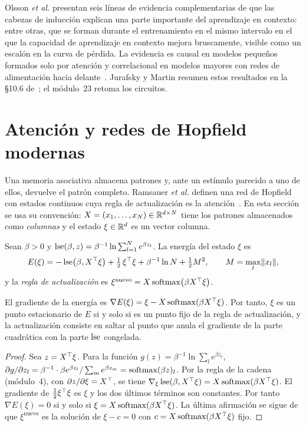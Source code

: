 \begin{observacion}
Olsson \emph{et al.} presentan seis líneas de evidencia complementarias de que las cabezas de inducción explican una parte importante del aprendizaje en contexto: entre otras, que se forman durante el entrenamiento en el mismo intervalo en el que la capacidad de aprendizaje en contexto mejora bruscamente, visible como un escalón en la curva de pérdida. La evidencia es causal en modelos pequeños formados solo por atención y correlacional en modelos mayores con redes de alimentación hacia delante~\cite{olsson}. Jurafsky y Martin resumen estos resultados en la §10.6 de~\cite{jm3}; el módulo~23 retoma los circuitos.
\end{observacion}

\section{Atención y redes de Hopfield modernas}

Una memoria asociativa almacena patrones y, ante un estímulo parecido a uno de ellos, devuelve el patrón completo. Ramsauer \emph{et al.} definen una red de Hopfield con estados continuos cuya regla de actualización es la atención~\cite[§2]{ramsauer}. En esta sección se usa su convención: $X=(x_1,\dots,x_N)\in\mathbb{R}^{d\times N}$ tiene los patrones almacenados como \emph{columnas} y el estado $\xi\in\mathbb{R}^{d}$ es un vector columna.

\begin{definicion}\label{def:hopfield}
Sean $\beta>0$ y $\operatorname{lse}(\beta,z)=\beta^{-1}\ln\sum_{l=1}^{N}e^{\beta z_l}$. La energía del estado $\xi$ es
\[
E(\xi)=-\operatorname{lse}\bigl(\beta,X^{\top}\xi\bigr)+\tfrac12\,\xi^{\top}\xi+\beta^{-1}\ln N+\tfrac12M^{2},\qquad M=\max_l\lVert x_l\rVert,
\]
y la \emph{regla de actualización} es $\xi^{\text{nuevo}}=X\operatorname{softmax}\bigl(\beta X^{\top}\xi\bigr)$.
\end{definicion}

\begin{proposicion}\label{prop:hopfield}
El gradiente de la energía es $\nabla E(\xi)=\xi-X\operatorname{softmax}(\beta X^{\top}\xi)$. Por tanto, $\xi$ es un punto estacionario de $E$ si y solo si es un punto fijo de la regla de actualización, y la actualización consiste en saltar al punto que anula el gradiente de la parte cuadrática con la parte $\operatorname{lse}$ congelada.
\end{proposicion}

\begin{proof}
Sea $z=X^{\top}\xi$. Para la función $g(z)=\beta^{-1}\ln\sum_le^{\beta z_l}$, $\partial g/\partial z_l=\beta^{-1}\cdot\beta e^{\beta z_l}/\sum_me^{\beta z_m}=\operatorname{softmax}(\beta z)_l$. Por la regla de la cadena (módulo~4), con $\partial z/\partial\xi=X^{\top}$, se tiene $\nabla_\xi\operatorname{lse}(\beta,X^{\top}\xi)=X\operatorname{softmax}(\beta X^{\top}\xi)$. El gradiente de $\tfrac12\xi^{\top}\xi$ es $\xi$ y los dos últimos términos son constantes. Por tanto $\nabla E(\xi)=0$ si y solo si $\xi=X\operatorname{softmax}(\beta X^{\top}\xi)$. La última afirmación se sigue de que $\xi^{\text{nuevo}}$ es la solución de $\xi-c=0$ con $c=X\operatorname{softmax}(\beta X^{\top}\xi)$ fijo.
\end{proof}

